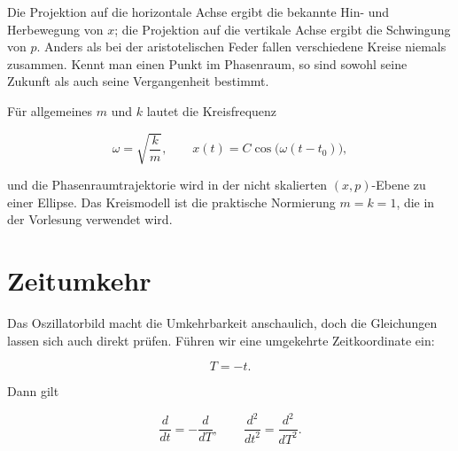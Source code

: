 Die Projektion auf die horizontale Achse ergibt die bekannte Hin- und Herbewegung von \(x\); die Projektion auf die vertikale Achse ergibt die Schwingung von \(p\). Anders als bei der aristotelischen Feder fallen verschiedene Kreise niemals zusammen. Kennt man einen Punkt im Phasenraum, so sind sowohl seine Zukunft als auch seine Vergangenheit bestimmt.

Für allgemeines \(m\) und \(k\) lautet die Kreisfrequenz

\begin{equation}
  \omega=\sqrt{\frac{k}{m}},
  \qquad
  x(t)=C\cos\bigl(\omega(t-t_0)\bigr),
  \label{eq:general-oscillator-frequency}
\end{equation}

und die Phasenraumtrajektorie wird in der nicht skalierten \((x,p)\)-Ebene zu einer Ellipse. Das Kreismodell ist die praktische Normierung \(m=k=1\), die in der Vorlesung verwendet wird.

\begin{classroomqa}\end{classroomqa}

\section{Zeitumkehr}

Das Oszillatorbild macht die Umkehrbarkeit anschaulich, doch die Gleichungen lassen sich auch direkt prüfen. Führen wir eine umgekehrte Zeitkoordinate ein:

\begin{equation}
  T=-t.
  \label{eq:reverse-time}
\end{equation}

Dann gilt

\begin{equation}
  \frac{d}{dt}=-\frac{d}{dT},
  \qquad
  \frac{d^2}{dt^2}=\frac{d^2}{dT^2}.
  \label{eq:time-derivative-parity}
\end{equation}

